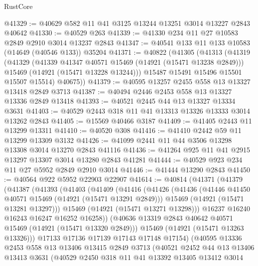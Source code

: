 \begin{lexlean}{RustCore}
\begin{coremodule}
@41329 := @40629 @582 @11 @41 @3125 @13244 @13251 @3014 @13227 @2843 @40642
@41330 := @40529 @263
@41339 := @41330 @234 @11 @27 @10583 @2849 @2910 @3014 @13237 @2843
@41347 := @40541 @133 @11 @133 @10583 (@14649 (@40546 @133)) @35204
@41371 := @40822
    (@41305
      (@41313
        (@41319
          (@41329
            (@41339 @41347 @40571 @15469 (@14921 (@15471 @13238 @2849)))
            @15469
            (@14921 (@15471 @13228 @13244)))
          @15487
          @15491
          @15496
          @15501
          @15507
          @15514)
        @40675))
@41379 := @40595 @13257 @2455 @558 @13 @13327 @13418 @2849 @3713
@41387 := @40494 @2446 @2453 @558 @13 @13327 @13336 @2849 @13418
@41393 := @40521 @2445 @44 @13 @13327 @13334 @3631
@41403 := @40529 @2443 @318 @11 @41 @13313 @13326 @13333 @3014 @13262 @2843
@41405 := @15569 @40466 @3187
@41409 := @41405 @2443 @11 @13299 @13311
@41410 := @40520 @308
@41416 := @41410 @2442 @59 @11 @13299 @13309 @3132
@41426 := @41099 @2441 @11 @44 @3506 @13298 @13308 @3014 @13270 @2843 @41116
@41436 := @41264 @925 @11 @41 @2915 @13297 @13307 @3014 @13280 @2843 @41281
@41444 := @40529 @923 @234 @11 @27 @5952 @2849 @2910 @3014
@41446 := @41444 @13290 @2843
@41450 := @40564 @922 @5952 @22903 @22907
@41614 := @40814
    (@41371
      (@41379
        (@41387
          (@41393
            (@41403
              (@41409
                (@41416
                  (@41426
                    (@41436
                      (@41446 @41450 @40571 @15469 (@14921 (@15471 @13291 @2849)))
                      @15469
                      (@14921 (@15471 @13281 @13297)))
                    @15469
                    (@14921 (@15471 @13271 @13298)))
                  @16237
                  @16240
                  @16243
                  @16247
                  @16252
                  @16258))
              (@40636 @13319 @2843 @40642 @40571 @15469 (@14921 (@15471 @13320 @2849)))
              @15469
              (@14921 (@15471 @13263 @13326)))
            @17133
            @17136
            @17139
            @17143
            @17148
            @17154)
          (@40595
            @13336
            @2453
            @558
            @13
            @13406
            @13415
            @2849
            @3713
            (@40521
              @2452
              @44
              @13
              @13406
              @13413
              @3631
              (@40529
                @2450
                @318
                @11
                @41
                @13392
                @13405
                @13412
                @3014

\end{coremodule}
\end{lexlean}
